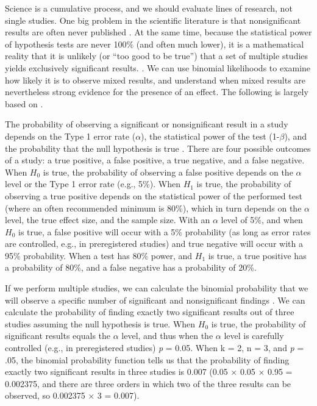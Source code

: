 \documentclass[
  oneside]{krantz}
\begin{document}
Science is a cumulative process, and we should evaluate lines of research, not single studies. One big problem in the scientific literature is that nonsignificant results are often never published \citep{franco_publication_2014, fanelli_positive_2010}. At the same time, because the statistical power of hypothesis tests are never 100\% (and often much lower), it is a mathematical reality that it is unlikely (or ``too good to be true'') that a set of multiple studies yields exclusively significant results. \citep{schimmack_ironic_2012, francis_frequency_2014}. We can use binomial likelihoods to examine how likely it is to observe mixed results, and understand when mixed results are nevertheless strong evidence for the presence of an effect. The following is largely based on \citet{lakens_too_2017}.

The probability of observing a significant or nonsignificant result in a study depends on the Type 1 error rate (\(\alpha\)), the statistical power of the test (1-\(\beta\)), and the probability that the null hypothesis is true \citep{wacholder_assessing_2004}. There are four possible outcomes of a study: a true positive, a false positive, a true negative, and a false negative. When \(H_0\) is true, the probability of observing a false positive depends on the \(\alpha\) level or the Type 1 error rate (e.g., 5\%). When \(H_1\) is true, the probability of observing a true positive depends on the statistical power of the performed test (where an often recommended minimum is 80\%), which in turn depends on the \(\alpha\) level, the true effect size, and the sample size. With an \(\alpha\) level of 5\%, and when \(H_0\) is true, a false positive will occur with a 5\% probability (as long as error rates are controlled, e.g., in preregistered studies) and true negative will occur with a 95\% probability. When a test has 80\% power, and \(H_1\) is true, a true positive has a probability of 80\%, and a false negative has a probability of 20\%.

If we perform multiple studies, we can calculate the binomial probability that we will observe a specific number of significant and nonsignificant findings \citep{ioannidis_exploratory_2007}. We can calculate the probability of finding exactly two significant results out of three studies assuming the null hypothesis is true. When \(H_0\) is true, the probability of significant results equals the \(\alpha\) level, and thus when the \(\alpha\) level is carefully controlled (e.g., in preregistered studies) \emph{p} = 0.05. When k = 2, n = 3, and \emph{p} = .05, the binomial probability function tells us that the probability of finding exactly two significant results in three studies is 0.007 (0.05 × 0.05 × 0.95 = 0.002375, and there are three orders in which two of the three results can be observed, so 0.002375 × 3 = 0.007).
\end{document}
